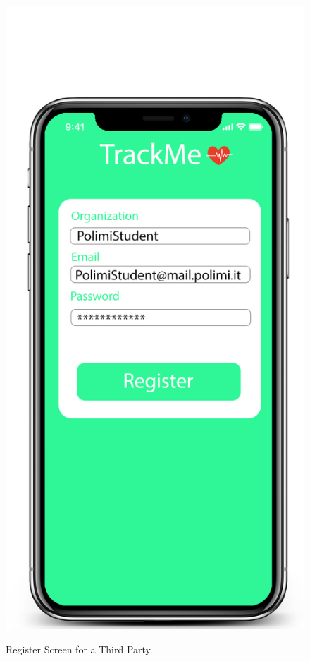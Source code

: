 \documentclass[12pt]{article}
\begin{document}
\begin{figure}[H]
\centering
\includegraphics[scale=0.2]{RegisterScreen-ThirdParty.png}
\label{fig:RegisterScreen-ThirdParty}
\caption{Register Screen for a Third Party.}
\end{figure}
\end{document}
